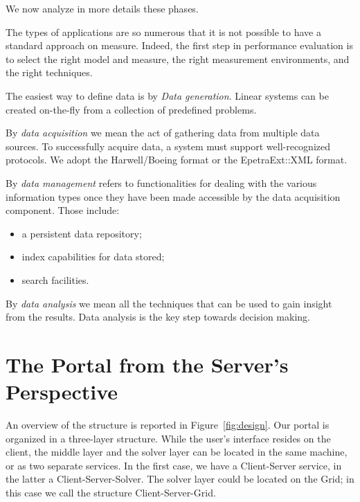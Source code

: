 \documentclass[11pt,relax]{SANDreport}
\begin{document}
We now analyze in more details these phases.

The types of applications
are so numerous that it is not possible to have a standard approach on
measure. Indeed, the first step in performance evaluation is to select the
right model and measure, the right measurement environments, and the right
techniques.

The easiest way to define data is by {\sl Data generation}. Linear systems can
be created on-the-fly from a collection of predefined problems.

By {\sl data acquisition} we mean the act of gathering data from multiple data
sources. To successfully acquire data, a system must support well-recognized
protocols. We adopt the Harwell/Boeing format or the
EpetraExt::XML format.

By {\sl data management} refers to functionalities for dealing with the various
information types once they have been made accessible by the data acquisition
component. Those include:
\begin{itemize}
\setlength{\itemsep}{0pt}
\item a persistent data repository;
\item index capabilities for data stored;
\item search facilities.
\end{itemize}

By {\sl data analysis} we mean all the techniques that can be used to gain
insight from the results. Data analysis is the key step towards decision
making. 

\section{The Portal from the Server's Perspective}
\label{sec:computational}

An overview of the structure is reported in Figure~\ref{fig:design}.
Our portal is organized in a three-layer structure. While the user's interface
resides on the client, the middle layer and the solver layer can be located in
the same machine, or as two separate services. In the first case, we have a
Client-Server service, in the latter a Client-Server-Solver. The solver layer
could be located on the Grid; in this case we call the structure
Client-Server-Grid.
\end{document}
